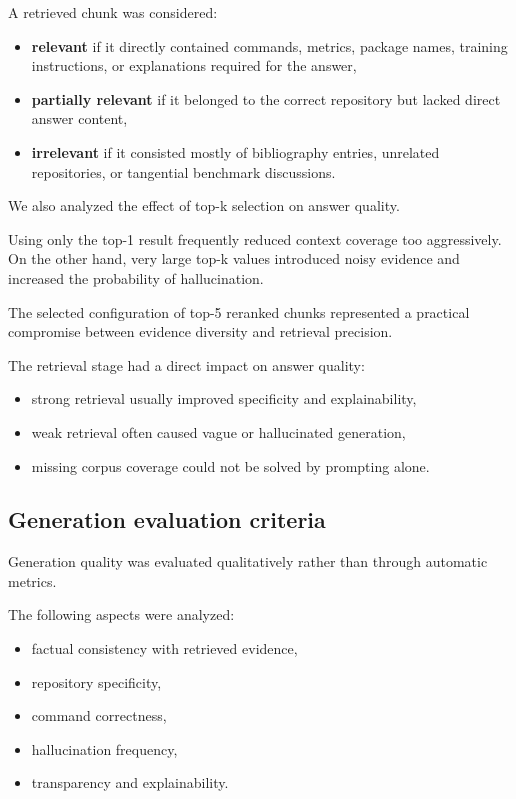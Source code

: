 \documentclass[11pt,a4paper]{article}
\begin{document}
A retrieved chunk was considered:

\begin{itemize}
  \item \textbf{relevant} if it directly contained commands, metrics, package names, training instructions, or explanations required for the answer,

  \item \textbf{partially relevant} if it belonged to the correct repository but lacked direct answer content,

  \item \textbf{irrelevant} if it consisted mostly of bibliography entries, unrelated repositories, or tangential benchmark discussions.
\end{itemize}

We also analyzed the effect of top-k selection on answer quality.

Using only the top-1 result frequently reduced context coverage too aggressively. On the other hand, very large top-k values introduced noisy evidence and increased the probability of hallucination.

The selected configuration of top-5 reranked chunks represented a practical compromise between evidence diversity and retrieval precision.

The retrieval stage had a direct impact on answer quality:

\begin{itemize}
  \item strong retrieval usually improved specificity and explainability,
  \item weak retrieval often caused vague or hallucinated generation,
  \item missing corpus coverage could not be solved by prompting alone.
\end{itemize}

\subsection{Generation evaluation criteria}
Generation quality was evaluated qualitatively rather than through automatic metrics.

The following aspects were analyzed:

\begin{itemize}
  \item factual consistency with retrieved evidence,
  \item repository specificity,
  \item command correctness,
  \item hallucination frequency,
  \item transparency and explainability.
\end{itemize}
\end{document}
